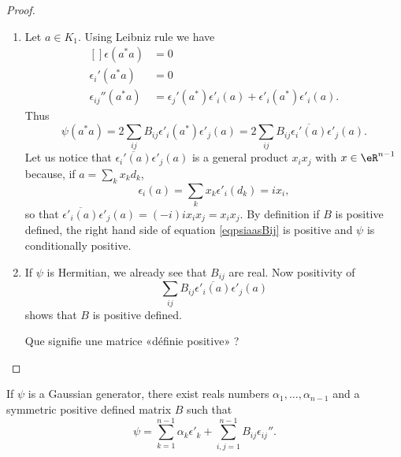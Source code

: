 \begin{proof}
\begin{enumerate}
		\item
		      Let $a\in K_1$. Using Leibniz rule we have
		      \begin{equation}
			      \begin{aligned}[]
				      \epsilon(a^*a)        & =0                                                              \\
				      \epsilon_i'(a^*a)     & =0                                                              \\
				      \epsilon_{ij}''(a^*a) & =\epsilon_j'(a^*)\epsilon'_i(a)+\epsilon'_i(a^*)\epsilon'_i(a).
			      \end{aligned}
		      \end{equation}
		      Thus
		      \begin{equation}        \label{eqpsiaasBij}
			      \psi(a^*a)=2\sum_{ij}B_{ij}\epsilon'_i(a^*)\epsilon'_j(a)=2\sum_{ij}B_{ij}\overline{ \epsilon_i'(a) }\epsilon'_j(a).
		      \end{equation}
		      Let us notice that $\overline{ \epsilon_i'(a) }\epsilon'_j(a)$ is a general product $x_ix_j$ with $x\in\eR^{n-1}$ because, if $a=\sum_kx_kd_k$,
		      \begin{equation}
			      \epsilon_i(a)=\sum_kx_k\epsilon'_i(d_k)=ix_i,
		      \end{equation}
		      so that $\overline{ \epsilon'_i(a) }\epsilon'_j(a)=(-i)ix_ix_j=x_ix_j$. By definition if $B$ is positive defined, the right hand side of equation \eqref{eqpsiaasBij} is positive and $\psi$ is conditionally positive.

		\item
		      If $\psi$ is Hermitian, we already see that $B_{ij}$ are real. Now positivity of
		      \begin{equation}
			      \sum_{ij}B_{ij}\overline{ \epsilon'_i(a) }\epsilon'_j(a)
		      \end{equation}
		      shows that $B$ is positive defined.

		      \begin{probleme}
			      Que signifie une matrice «définie positive» ?
		      \end{probleme}

	\end{enumerate}

\end{proof}

\begin{corollary}
	If $\psi$ is a Gaussian generator, there exist reals numbers $\alpha_1,\ldots,\alpha_{n-1}$ and a symmetric positive defined matrix $B$ such that
	\begin{equation}
		\psi=\sum_{k=1}^{n-1}\alpha_k\epsilon'_k+\sum_{i,j=1}^{n-1}B_{ij}\epsilon_{ij}''.
	\end{equation}
\end{corollary}

